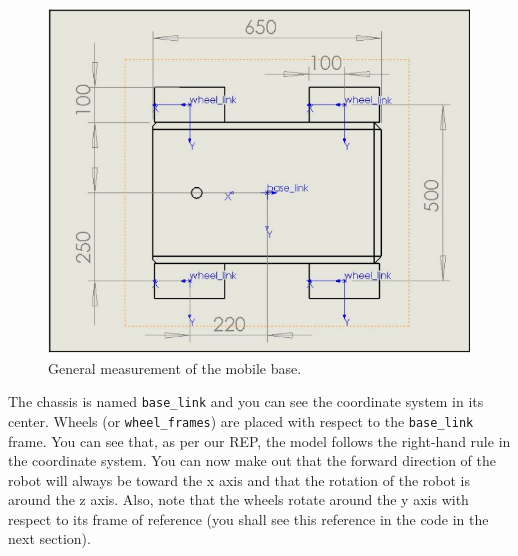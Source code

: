 \documentclass[letterpaper,pdftex]{article}
\begin{document}
\begin{figure}
\centering
\includegraphics[scale=0.5]{mobile_measurements.png}
\caption{General measurement of the mobile base.}
\end{figure}

The chassis is named \verb|base_link| and you can see the coordinate system in its center. Wheels (or \verb|wheel_frames|) are placed with respect to the \verb|base_link| frame. You can see that, as per our REP, the model follows the right-hand rule in the coordinate system. You can now make out that the forward direction of the robot will always be toward the x axis and that the rotation of the robot is around the z axis. Also, note that the wheels rotate around the y axis with respect to its frame of reference (you shall see this reference in the code in the next section).




%   
%  
\end{document}
